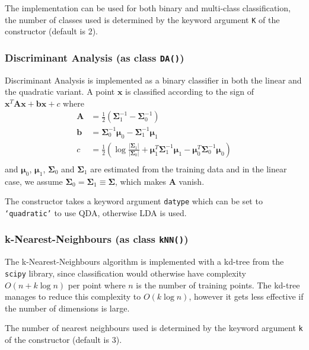 \documentclass[a4paper, 12pt]{article}
\begin{document}
The implementation can be used for both binary and multi-class classification, the number of classes used is determined by the keyword argument \texttt{K} of the constructor (default is 2).
    
\subsubsection{Discriminant Analysis (as class \texttt{DA()})}
Discriminant Analysis is implemented as a binary classifier in both the linear and the quadratic variant. A point $\mathbf{x}$ is classified according to the sign of $\mathbf{x}^T\mathbf{Ax} + \mathbf{bx} + c$ where
\begin{align*}
\mathbf{A} &= \frac{1}{2} \left(\bm{\Sigma}_1^{-1} - \bm{\Sigma}_0^{-1}\right) \\
\mathbf{b} &= \bm{\Sigma}_0^{-1}\bm{\mu}_0 - \bm{\Sigma}_1^{-1}\bm{\mu}_1 \\
c &= \frac{1}{2} \left( \log\frac{|\bm{\Sigma}_1|}{|\bm{\Sigma}_0|} + \bm{\mu}_1^T\bm{\Sigma}_1^{-1}\bm{\mu}_1 - \bm{\mu}_0^T\bm{\Sigma}_0^{-1}\bm{\mu}_0 \right) \\
\end{align*}
and $\bm{\mu}_0$, $\bm{\mu}_1$, $\bm{\Sigma}_0$ and $\bm{\Sigma}_1$ are estimated from the training data and in the linear case, we assume $\bm{\Sigma}_0 = \bm{\Sigma}_1 \equiv \bm{\Sigma}$, which makes $\mathbf{A}$ vanish.

The constructor takes a keyword argument \texttt{datype} which can be set to \texttt{`quadratic'} to use QDA, otherwise LDA is used.

\subsubsection{k-Nearest-Neighbours (as class \texttt{kNN()})}
The k-Nearest-Neighbours algorithm is implemented with a kd-tree from the \texttt{scipy} library, since classification would otherwise have complexity $O(n + k \log n)$ per point where $n$ is the number of training points. The kd-tree manages to reduce this complexity to $O(k \log n)$, however it gets less effective if the number of dimensions is large.

The number of nearest neighbours used is determined by the keyword argument \texttt{k} of the constructor (default is 3).
\end{document}
